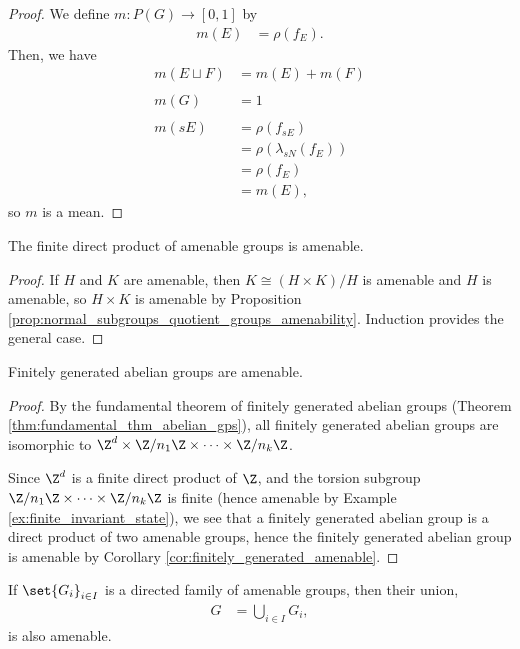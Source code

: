 \documentclass[10pt]{mypackage2}
\begin{document}
\begin{proof}
  We define $m\colon P(G)\rightarrow [0,1]$ by
  \begin{align*}
    m(E) &= \rho\left(f_E\right).
  \end{align*}
  Then, we have
  \begin{align*}
    m\left(E\sqcup F\right) &= m(E) + m(F)\\
                            \\
    m\left(G\right) &= 1\\
    \\
    m\left(sE\right) &= \rho\left(f_{sE}\right)\\
                     &= \rho\left(\lambda_{sN}\left(f_{E}\right)\right)\\
                     &= \rho\left(f_E\right)\\
                     &= m(E),
  \end{align*}
  so $m$ is a mean.
\end{proof}
\begin{corollary}\label{cor:finite_direct_product_amenable}
  The finite direct product of amenable groups is amenable.
\end{corollary}
\begin{proof}
  If $H$ and $K$ are amenable, then $K\cong \left(H\times K\right)/H$ is amenable and $H$ is amenable, so $H\times K$ is amenable by Proposition \ref{prop:normal_subgroups_quotient_groups_amenability}. Induction provides the general case.
\end{proof}
\begin{corollary}\label{cor:finitely_generated_amenable}
  Finitely generated abelian groups are amenable.
\end{corollary}
\begin{proof}
  By the fundamental theorem of finitely generated abelian groups (Theorem \ref{thm:fundamental_thm_abelian_gps}), all finitely generated abelian groups are isomorphic to $\Z^{d}\times \Z/n_1\Z\times\cdots\times \Z/{n_k}\Z$.\newline

  Since $\Z^{d}$ is a finite direct product of $\Z$, and the torsion subgroup $\Z/n_1\Z\times\cdots\times \Z/n_k\Z$ is finite (hence amenable by Example \ref{ex:finite_invariant_state}), we see that a finitely generated abelian group is a direct product of two amenable groups, hence the finitely generated abelian group is amenable by Corollary \ref{cor:finitely_generated_amenable}.
\end{proof}
\begin{corollary}\label{cor:direct_limit_amenable}
  If $\set{G_i}_{i\in I}$ is a directed family of amenable groups, then their union,
  \begin{align*}
    G &= \bigcup_{i\in I}G_i,
  \end{align*}
  is also amenable.
\end{corollary}
\end{document}
